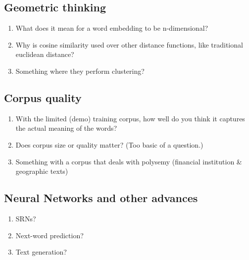 \subsection{Geometric thinking}

\begin{enumerate}
\item What does it mean for a word embedding to be n-dimensional?
\item Why is cosine similarity used over other distance functions, like traditional euclidean distance?
\item Something where they perform clustering?
\end{enumerate}

\subsection{Corpus quality}

\begin{enumerate}
\item With the limited (demo) training corpus, how well do you think it captures the actual meaning of the words?
\item Does corpus size or quality matter? (Too basic of a question.)
\item Something with a corpus that deals with polysemy (financial institution \& geographic texts)
\end{enumerate}

\subsection{Neural Networks and other advances}

\begin{enumerate}
\item SRNs?
\item Next-word prediction?
\item Text generation?
\end{enumerate}